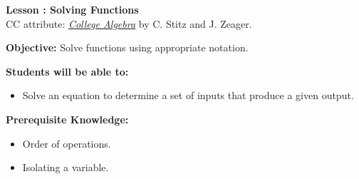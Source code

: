 \documentclass[12pt]{article}
\theoremstyle{definition}
\begin{document}
{\bf \large Lesson : Solving Functions}
\\ CC attribute: \href{http://www.stitz-zeager.com}{\it{College Algebra}} by C. Stitz and J. Zeager. 
\hfill \doclicenseImage[imagewidth=5em]\\
\par
{\bf Objective:} Solve functions using appropriate notation.\\
\par
{\bf Students will be able to:}
\begin{itemize}
	\item Solve an equation to determine a set of inputs that produce a given output.
\end{itemize}
{\bf Prerequisite Knowledge:}
\begin{itemize}
	\item Order of operations.
	\item Isolating a variable.
\end{itemize}
\hrulefill
\end{document}
